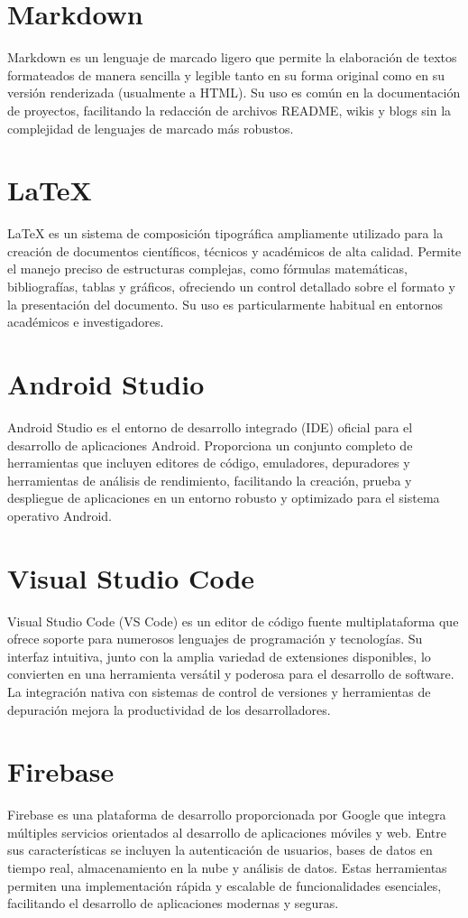 \documentclass[a4paper,12pt]{report}
\begin{document}
    \section*{Markdown}
      Markdown es un lenguaje de marcado ligero que permite la elaboración de textos formateados de manera sencilla y legible tanto en su forma original como en su versión renderizada (usualmente a HTML). Su uso es común en la documentación de proyectos, facilitando la redacción de archivos README, wikis y blogs sin la complejidad de lenguajes de marcado más robustos.
    \section*{LaTeX}
      LaTeX es un sistema de composición tipográfica ampliamente utilizado para la creación de documentos científicos, técnicos y académicos de alta calidad. Permite el manejo preciso de estructuras complejas, como fórmulas matemáticas, bibliografías, tablas y gráficos, ofreciendo un control detallado sobre el formato y la presentación del documento. Su uso es particularmente habitual en entornos académicos e investigadores.
    \section*{Android Studio}
      Android Studio es el entorno de desarrollo integrado (IDE) oficial para el desarrollo de aplicaciones Android. Proporciona un conjunto completo de herramientas que incluyen editores de código, emuladores, depuradores y herramientas de análisis de rendimiento, facilitando la creación, prueba y despliegue de aplicaciones en un entorno robusto y optimizado para el sistema operativo Android.
    \section*{Visual Studio Code}
      Visual Studio Code (VS Code) es un editor de código fuente multiplataforma que ofrece soporte para numerosos lenguajes de programación y tecnologías. Su interfaz intuitiva, junto con la amplia variedad de extensiones disponibles, lo convierten en una herramienta versátil y poderosa para el desarrollo de software. La integración nativa con sistemas de control de versiones y herramientas de depuración mejora la productividad de los desarrolladores.
    \section*{Firebase}
      Firebase es una plataforma de desarrollo proporcionada por Google que integra múltiples servicios orientados al desarrollo de aplicaciones móviles y web. Entre sus características se incluyen la autenticación de usuarios, bases de datos en tiempo real, almacenamiento en la nube y análisis de datos. Estas herramientas permiten una implementación rápida y escalable de funcionalidades esenciales, facilitando el desarrollo de aplicaciones modernas y seguras.
\end{document}
